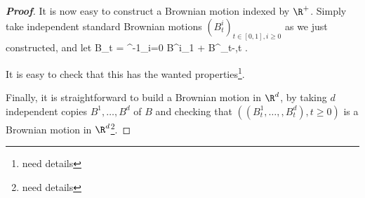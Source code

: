 \begin{proof}[\bf Proof]
It is now easy to construct a Brownian motion indexed by $\R^+$. Simply take independent standard Brownian motions $(B^i_t)_{t\in [0 ,1],i \geq 0}$ as we just constructed, and let
\be
B_t = \sum^{-1}_{i=0} B^i_1 + B^{}_{t-},\quad t .
\ee

It is easy to check that this has the wanted properties\footnote{need details}.

Finally, it is straightforward to build a Brownian motion in $\R^d$, by taking $d$ independent copies $B^1,\dots,B^d$ of $B$ and checking that $((B^1_t ,\dots, ,B^d_t ), t \geq 0)$ is a Brownian motion in $\R^d$\footnote{need details}.
\end{proof}





